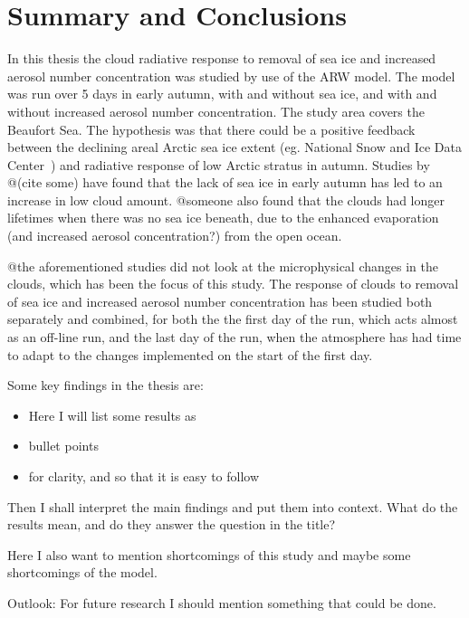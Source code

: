 \chapter{Summary and Conclusions}
\label{chap:summaryconclusions}
In this thesis the cloud radiative response to removal of sea ice and increased aerosol number concentration was studied by use of the ARW model. The model was run over 5 days in early autumn, with and without sea ice, and with and without increased aerosol number concentration. The study area covers the Beaufort Sea. The hypothesis was that there could be a positive feedback between the declining areal Arctic sea ice extent (eg. National Snow and Ice Data Center~\citep{NSIDC}) and radiative response of low Arctic stratus in autumn. Studies by @(cite some) have found that the lack of sea ice in early autumn has led to an increase in low cloud amount. @someone also found that the clouds had longer lifetimes when there was no sea ice beneath, due to the enhanced evaporation (and increased aerosol concentration?) from the open ocean. 

@the aforementioned studies did not look at the microphysical changes in the clouds, which has been the focus of this study. The response of clouds to removal of sea ice and increased aerosol number concentration has been studied both separately and combined, for both the the first day of the run, which acts almost as an off-line run, and the last day of the run, when the atmosphere has had time to adapt to the changes implemented on the start of the first day.

Some key findings in the thesis are:
\begin{itemize}
\item Here I will list some results as 
\item bullet points
\item for clarity, and so that it is easy to follow
\end{itemize}

Then I shall interpret the main findings and put them into context. What do the results mean, and do they answer the question in the title? 

Here I also want to mention shortcomings of this study and maybe some shortcomings of the model.


Outlook: For future research I should mention something that could be done.



